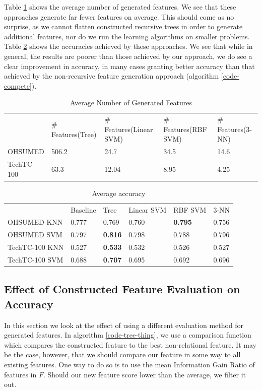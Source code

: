 \documentclass[twoside,11pt]{article}
\theoremstyle{definition}
\begin{document}
Table \ref{table:features-nontree} shows the average number of generated features. We see that these approaches generate far fewer features on average. This should come as no surprise, as we cannot flatten constructed recursive trees in order to generate additional features, nor do we run the learning algorithms on smaller problems.
Table \ref{table:acc-nontree} shows the accuracies achieved by these approaches. We see that while in general, the results are poorer than those achieved by our approach, we do see a clear improvement in accuracy, in many cases granting better accuracy than that achieved by the non-recursive feature generation approach (algorithm \ref{code-compete}).

\begin{table}[]
	\centering
	\caption{Average Number of Generated Features}
	\label{table:features-nontree}
	\begin{tabular}{lllll}
		& \# Features(Tree)  & \# Features(Linear SVM)  & \# Features(RBF SVM) & \# Features(3-NN) \\
		OHSUMED      & 506.2  &  24.7 & 34.5  & 14.6     \\
		TechTC-100  & 63.3   &   12.04    &  8.95   & 4.25        
	\end{tabular}
\end{table}

\begin{table}[]
	\centering
	\caption{Average accuracy}
	\label{table:acc-nontree}
	\begin{tabular}{llllll}
		& Baseline 	& Tree  & Linear SVM & RBF SVM & 3-NN        \\
		OHSUMED KNN    & 0.777  & 0.769  & 0.760 & \textbf{0.795} & 0.756     \\
		OHSUMED SVM    & 0.797    & \textbf{0.816}   & 0.798 & 0.788 & 0.796  \\
		TechTC-100 KNN & 0.527  & \textbf{0.533}  & 0.532  & 0.526 &  0.527 \\
		TechTC-100 SVM & 0.688  & \textbf{0.707}  & 0.695 & 0.692 &  0.696
	\end{tabular}
\end{table}

\subsection{Effect of Constructed Feature Evaluation on Accuracy}

In this section we look at the effect of using a different evaluation method for generated features. In algorithm \ref{code-tree-thing}, we use a comparison function which compares the constructed feature to the best non-relational feature. It may be the case, however, that we should compare our feature in some way to all existing features. One way to do so is to use the mean Information Gain Ratio of features in $F$. Should our new feature score lower than the average, we filter it out. 
\end{document}
